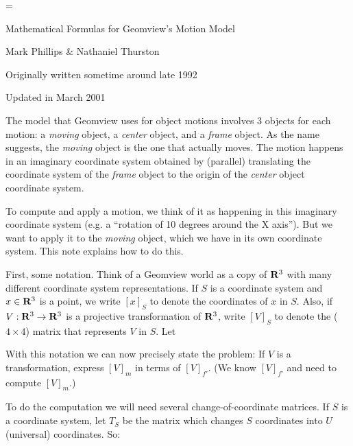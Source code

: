 \magnification=

\centerline{Mathematical Formulas for Geomview's Motion Model}
\centerline{Mark Phillips \& Nathaniel Thurston}
\smallskip
\centerline{Originally written sometime around late 1992}
\centerline{Updated in March 2001}

\bigskip

The model that Geomview uses for object motions involves 3 objects
for each motion: a {\it moving} object, a {\it center} object,
and a {\it frame} object.  As the name suggests, the {\it moving}
object is the one that actually moves.  The motion happens in
an imaginary coordinate system obtained by (parallel) translating
the coordinate system of the {\it frame} object to the origin
of the {\it center} object coordinate system.

To compute and apply a motion, we think of it as happening in
this imaginary coordinate system (e.g. a ``rotation of 10 degrees around
the X axis'').  But we want to apply it to the {\it moving} object,
which we have in its own coordinate system.  This note explains
how to do this.

First, some notation.
Think of a Geomview world as a copy of ${\bf R}^3$
with many different coordinate system representations.  If $S$ is a
coordinate system and $x \in {\bf R}^3$ is a point, we write $[x]_S$
to denote the coordinates of $x$ in $S$.  Also, if $V: {\bf R}^3
\rightarrow {\bf R}^3$ is a projective transformation of ${\bf R}^3$,
write $[V]_S$ to denote the ($4 \times 4$) matrix that represents
$V$ in $S$.  Let

\smallskip
{}
\smallskip

With this notation we can now precisely state the problem: If $V$ is a
transformation, express $[V]_m$ in terms of $[V]_{f'}$.  (We know
$[V]_{f'}$ and need to compute $[V]_m$.)

To do the computation we will need several change-of-coordinate
matrices.  If $S$ is a coordinate system, let $T_S$ be the matrix
which changes $S$ coordinates into $U$ (universal) coordinates.  So:

\smallskip
{}
\smallskip

